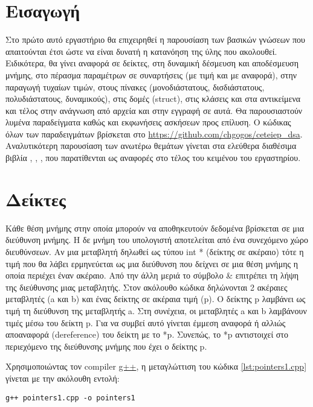 \section{Εισαγωγή}
Στο πρώτο αυτό εργαστήριο θα επιχειρηθεί η παρουσίαση των βασικών γνώσεων που απαιτούνται έτσι ώστε να είναι δυνατή η κατανόηση της ύλης που ακολουθεί. Ειδικότερα, θα γίνει αναφορά σε δείκτες, στη δυναμική δέσμευση και αποδέσμευση μνήμης, στο πέρασμα παραμέτρων σε συναρτήσεις (με τιμή και με αναφορά), στην παραγωγή τυχαίων τιμών, στους πίνακες (μονοδιάστατους, δισδιάστατους, πολυδιάστατους, δυναμικούς), στις δομές (struct), στις κλάσεις και στα αντικείμενα και τέλος στην ανάγνωση από αρχεία και στην εγγραφή σε αυτά. Θα παρουσιαστούν λυμένα παραδείγματα καθώς και εκφωνήσεις ασκήσεων προς επίλυση. Ο κώδικας όλων των παραδειγμάτων βρίσκεται στο \href{https://github.com/chgogos/ceteiep_dsa}{https://github.com/chgogos/ceteiep\_dsa}. Αναλυτικότερη παρουσίαση των ανωτέρω θεμάτων γίνεται στα ελεύθερα διαθέσιμα βιβλία \cite{stamatiadis2017}, \cite{downey2012}, \cite{soulie2007}, \cite{hall2007} που παρατίθενται ως αναφορές στο τέλος του κειμένου του εργαστηρίου. 

\section{Δείκτες}
Κάθε θέση μνήμης στην οποία μπορούν να αποθηκευτούν δεδομένα βρίσκεται σε μια διεύθυνση μνήμης. Η δε μνήμη του υπολογιστή αποτελείται από ένα συνεχόμενο χώρο διευθύνσεων. Αν μια μεταβλητή δηλωθεί ως τύπου int * (δείκτης σε ακέραιο) τότε η τιμή που θα λάβει ερμηνεύεται ως μια διεύθυνση που δείχνει σε μια θέση μνήμης η οποία περιέχει έναν ακέραιο. Από την άλλη μεριά το σύμβολο \& επιτρέπει τη λήψη της διεύθυνσης μιας μεταβλητής. Στον ακόλουθο κώδικα δηλώνονται 2 ακέραιες μεταβλητές (a και b) και ένας δείκτης σε ακέραια τιμή (p). Ο δείκτης p λαμβάνει ως τιμή τη διεύθυνση της μεταβλητής a. Στη συνέχεια, οι μεταβλητές a και b λαμβάνουν τιμές μέσω του δείκτη p. Για να συμβεί αυτό γίνεται έμμεση αναφορά ή αλλιώς αποαναφορά (dereference) του δείκτη με το *p. Συνεπώς, το *p αντιστοιχεί στο περιεχόμενο της διεύθυνσης μνήμης που έχει ο δείκτης p.



Χρησιμοποιώντας τον compiler \href{https://gcc.gnu.org/}{g++}, η μεταγλώττιση του κώδικα \ref{lst:pointers1.cpp} γίνεται με την ακόλουθη εντολή:
\begin{lstlisting}[style=DOS]
g++ pointers1.cpp -o pointers1
\end{lstlisting}

